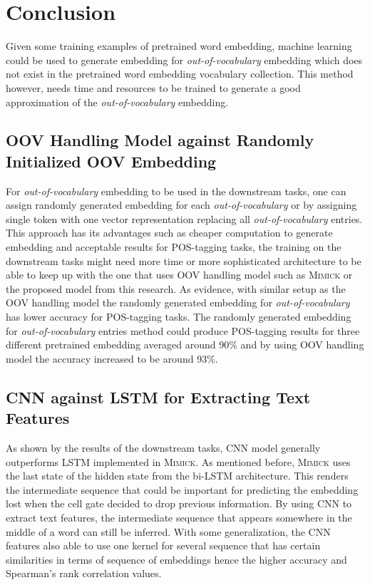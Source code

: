 \chapter{Conclusion}
\label{chap:conc}

Given some training examples of pretrained word embedding, machine
learning could be used to generate embedding for
\textit{out-of-vocabulary} embedding which does not exist in the
pretrained word embedding vocabulary collection. This method however,
needs time and resources to be trained to generate a good
approximation of the \textit{out-of-vocabulary} embedding.

\section{OOV Handling Model against Randomly Initialized OOV Embedding}
For \textit{out-of-vocabulary} embedding to be used in the downstream
tasks, one can assign randomly generated embedding for each
\textit{out-of-vocabulary} or by assigning single token with one
vector representation replacing all \textit{out-of-vocabulary}
entries. This approach has its advantages such as cheaper computation
to generate embedding and acceptable results for POS-tagging tasks,
the training on the downstream tasks might need more time or more
sophisticated architecture to be able to keep up with the one that
uses OOV handling model such as \textsc{Mimick} or the proposed model
from this research. As evidence, with similar setup as the OOV
handling model the randomly generated embedding for
\textit{out-of-vocabulary} has lower accuracy for POS-tagging tasks.
The randomly generated embedding for \textit{out-of-vocabulary}
entries method could produce POS-tagging results for three different
pretrained embedding averaged around 90\% and by using OOV handling
model the accuracy increased to be around 93\%.

\section{CNN against LSTM for Extracting Text Features}
As shown by the results of the downstream tasks, CNN model generally
outperforms LSTM implemented in \textsc{Mimick}. As mentioned before,
\textsc{Mimick} uses the last state of the hidden state from the
bi-LSTM architecture. This renders the intermediate sequence that
could be important for predicting the embedding lost when the cell
gate decided to drop previous information. By using CNN to extract
text features, the intermediate sequence that appears somewhere in the
middle of a word can still be inferred. With some generalization, the
CNN features also able to use one kernel for several sequence that has
certain similarities in terms of sequence of embeddings hence the
higher accuracy and Spearman's rank correlation values.

